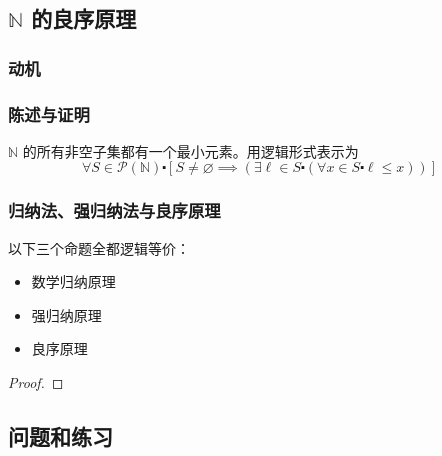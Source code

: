 \subsection{$\mathbb{N}$ 的良序原理}

\subsubsection*{动机}

\subsubsection*{陈述与证明}

\begin{theorem}
    $\mathbb{N}$ 的所有非空子集都有一个最小元素。用逻辑形式表示为
    \[\forall S \in \mathcal{P}(\mathbb{N}) \centerdot [S \ne \varnothing \implies (\exists \ell \in S \centerdot (\forall x \in S \centerdot \ell \le x))]\]
\end{theorem}

\subsubsection*{归纳法、强归纳法与良序原理}

\begin{theorem}
    以下三个命题全都逻辑等价：
    \begin{itemize}
        \item 数学归纳原理
        \item 强归纳原理
        \item 良序原理
    \end{itemize}
\end{theorem}

\begin{proof}
    
\end{proof}

\subsection{问题和练习}
